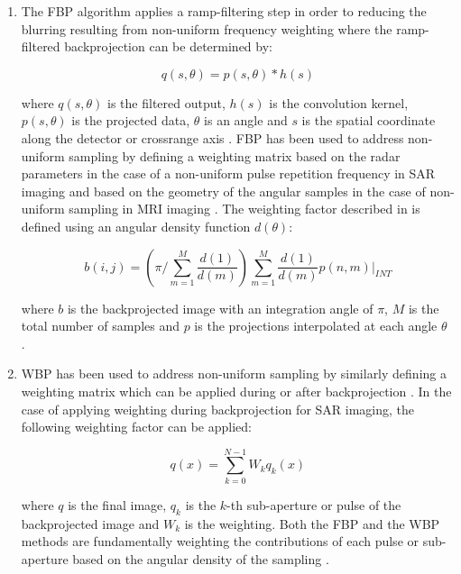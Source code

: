 \documentclass[conference]{IEEEtran}
\begin{document}
\begin{enumerate}
    \item The FBP algorithm applies a ramp-filtering step in order to reducing the blurring resulting from non-uniform frequency weighting \cite{Zeng_2010, Zeng_2012, Zeng_2014} where the ramp-filtered backprojection can be determined by:
    
    \begin{equation}
        q(s, \theta) = p(s,\theta) *h(s)
    \end{equation}
    
    where $q(s,\theta)$ is the filtered output, $h(s)$ is the convolution kernel, $p(s,\theta)$ is the projected data, $\theta$ is an angle and $s$ is the spatial coordinate along the detector or crossrange axis \cite{Zeng_2010}. FBP has been used to address non-uniform sampling by defining a weighting matrix based on the radar parameters in the case of a non-uniform pulse repetition frequency in SAR imaging \cite{Tang_2016} and based on the geometry of the angular samples in the case of non-uniform sampling in MRI imaging \cite{Zeng_2012}. The weighting factor described in \cite{Zeng_2012} is defined using an angular density function $d(\theta)$:

    \begin{equation}
        b(i,j) = \left( \pi/\sum_{m=1}^{M} \frac{d(1)}{d(m)} \right) \sum_{m=1}^{M} \frac{d(1)}{d(m)} p(n,m) |_{INT}
    \end{equation}

    where $b$ is the backprojected image with an integration angle of $\pi$, $M$ is the total number of samples and $p$ is the projections interpolated at each angle $\theta$ \cite{Zeng_2012}.
    
    \item WBP has been used to address non-uniform sampling by similarly defining a weighting matrix which can be applied during or after backprojection \cite{Tang_2016, Grathwohl_2025}. In the case of applying weighting during backprojection for SAR imaging, the following weighting factor can be applied:
    
    \begin{equation}
        q(x) = \sum_{k=0}^{N - 1} W_{k}q_{k}(x)
        \label{eq:wbp}
    \end{equation}
    
    where $q$ is the final image, $q_{k}$ is the $k$-th sub-aperture or pulse of the backprojected image and $W_{k}$ is the weighting. Both the FBP and the WBP methods are fundamentally weighting the contributions of each pulse or sub-aperture based on the angular density of the sampling \cite{Tang_2016}.
\end{enumerate}
\end{document}
